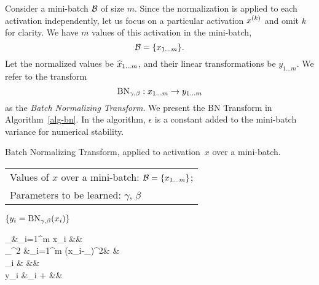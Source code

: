 \documentclass[twocolumn]{article}
\begin{document}
Consider a mini-batch $\setB$ of size $m$. Since the normalization is applied to
each activation independently, let us focus on a particular activation $x^\kk$ and omit $k$ for clarity. We have $m$ values of this activation
in the mini-batch,
$$\setB=\{x_{1\ldots m}\}.$$ Let the normalized values be
$\xhat_{1\ldots m}$, and their linear transformations be $y_{1\ldots m}$. We refer to the transform $$\BatchNorm_{\gamma,\beta}: x_{1\ldots m}\rightarrow y_{1\ldots m}$$ as the {\em Batch Normalizing  Transform}.
  We present the BN Transform in Algorithm~\ref{alg-bn}.  In the algorithm, $\epsilon$ is a constant  added to the mini-batch variance for numerical stability.

\begin{algorithm}
  \caption{Batch Normalizing Transform, applied to \mbox{activation $x$} over a mini-batch. }
\label{alg-bn}
  \begin{algorithmic}
  \REQUIRE 
  \begin{tabular}[t]{@{}l}Values of   $x$ over a mini-batch:
  $\setB=\{x_{1\ldots m}\}$;\\ 
 Parameters to be learned: $\gamma$,
    $\beta$ \end{tabular}
  \ENSURE $\{y_i =  \BN{x_i}{\gamma,\beta}\}$
  \begin{flalign*}
      \mu_\setB &\leftarrow {}\sum_{i=1}^m x_i &&\\
  \sigma_\setB^2 &\leftarrow {}\sum_{i=1}^m (x_i-\mu_\setB)^2& &\\
\xhat_i &\leftarrow {}   
&&\\
  y_i &\leftarrow \gamma\xhat_i + \beta  
  \equiv{}
    &&
  \end{flalign*}
\end{algorithmic}
\end{algorithm}
\end{document}
